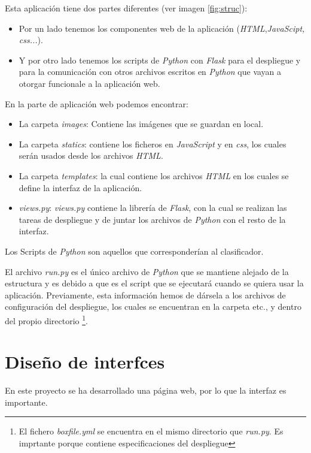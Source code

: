 Esta aplicación tiene dos partes diferentes (ver imagen \ref{fig:struc}):

\begin{itemize}
	\item Por un lado tenemos los componentes web de la aplicación (\textit{HTML},\textit{JavaScipt, css...}).
	\item Y por otro lado tenemos los scripts de \textit{Python} con \textit{Flask} para el despliegue y para la comunicación con otros archivos escritos en \textit{Python} que vayan a otorgar funcionale a la aplicación web.
\end{itemize}

En la parte de aplicación web podemos encontrar:
\begin{itemize}
	\item La carpeta \textit{images}: Contiene las imágenes que se guardan en local.
	\item La carpeta \textit{statics}: contiene los ficheros en \textit{JavaScript} y en \textit{css}, los cuales serán usados desde los archivos \textit{HTML}.
	\item La carpeta \textit{templates}: la cual contiene los archivos \textit{HTML} en los cuales se define la interfaz de la aplicación.
	\item \textit{views.py}: \textit{views.py} contiene la librería de \textit{Flask}, con la cual se realizan las tareas de despliegue y de juntar los archivos de \textit{Python} con el resto de la interfaz.
\end{itemize}
 
 Los Scripts de \textit{Python} son aquellos que corresponderían al clasificador.
 
 El archivo \textit{run.py} es el único archivo de \textit{Python} que se mantiene alejado de la estructura y es debido a que es el script que se ejecutará cuando se quiera usar la aplicación. Previamente, esta información hemos de dársela a los archivos de configuración del despliegue, los cuales se encuentran en la carpeta etc., y dentro del propio directorio \footnote{El fichero \textit{boxfile.yml} se encuentra en el mismo directorio que \textit{run.py}. Es imprtante porque contiene especificaciones del despliegue}.
 
 \section{Diseño de interfces}
 En este proyecto se ha desarrollado una página web, por lo que la interfaz es importante.
 
